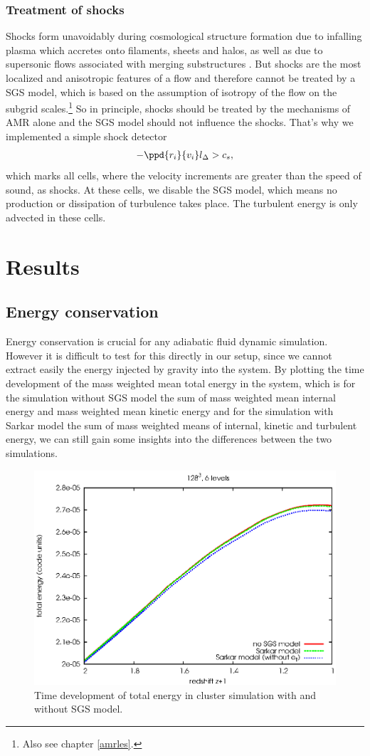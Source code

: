 \subsubsection{Treatment of shocks}
Shocks form unavoidably during cosmological structure formation due to
infalling plasma which accretes onto filaments, sheets and halos, as well as
due to supersonic flows associated with merging substructures
\citep{Pfrommer2006}. But shocks are the most localized and anisotropic
features of a flow and therefore cannot be treated by a SGS model, which 
is based on the assumption of isotropy of the flow on the subgrid
scales.\footnote{Also see chapter \ref{amrles}.} So in principle, shocks should
be treated by the mechanisms of AMR alone and the SGS model should
not influence the shocks. That's why we implemented a simple shock detector
\begin{align}
-\ppd{r_i}{v_i} l_{\Delta} > c_s,
\end{align}
which marks all cells, where the velocity increments are greater than the
speed of sound, as shocks. At these cells, we disable the SGS model, which
means no production or dissipation of turbulence takes place. The turbulent
energy is only advected in these cells.   

\section{Results}
\subsection{Energy conservation}
Energy conservation is crucial for any adiabatic fluid dynamic simulation.
However it is difficult to test for this directly in our setup, since we cannot
extract easily the energy injected by gravity into the system. By plotting the
time development of the mass weighted mean total energy in the system, which is
for the simulation without SGS model the sum of mass weighted mean internal
energy and mass weighted mean kinetic energy and for the simulation with Sarkar
model the sum of mass weighted means of internal, kinetic and turbulent energy,
we can still gain some insights into the differences between the two
simulations. 

\begin{figure}[tp]
\centering
\includegraphics[width=0.7\linewidth]{chapter9/energyerror.eps}
\caption{Time development of total energy in cluster simulation with and
without SGS model.}
\label{fig:etot}
\end{figure}

